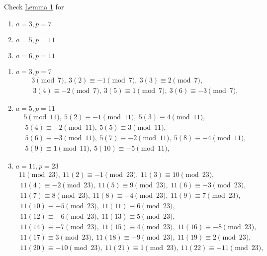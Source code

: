 \documentclass{ximera}
\begin{document}
\begin{br}
	Check \hyperref[lem:residues-gauss-lem]{Lemma 1} for 
	\begin{enumerate}
		\item $a=3, p=7$
		\item $a=5, p=11$
		\item $a=6, p=11$
	\end{enumerate}

	\begin{solution}
		\begin{enumerate}

		\item $a=3, p=7$ 
			\begin{align*}
				3\pmod{7},
				\ 3(2)\equiv -1\pmod{7},
				\ 3(3)\equiv 2\pmod{7},\\
				\ 3(4)\equiv -2\pmod{7},
				\ 3(5)\equiv 1\pmod{7},
				\ 3(6)\equiv -3\pmod{7},
			\end{align*}
		\item $a=5, p=11$
			\begin{align*}
				5\pmod{11},
				\ 5(2)\equiv -1\pmod{11},
				\ 5(3)\equiv 4\pmod{11},\\
				\ 5(4)\equiv -2\pmod{11},
				\ 5(5)\equiv 3\pmod{11},\\
				\ 5(6)\equiv -3\pmod{11},
				\ 5(7)\equiv -2\pmod{11},
				\ 5(8)\equiv -4\pmod{11},\\
				\ 5(9)\equiv 1\pmod{11},
				\ 5(10)\equiv -5\pmod{11},
			\end{align*}
		\item $a=11, p=23$
			\begin{align*}
				11\pmod{23},
				\ 11(2)\equiv -1\pmod{23},
				\ 11(3)\equiv 10\pmod{23},\\
				\ 11(4)\equiv -2\pmod{23},
				\ 11(5)\equiv 9\pmod{23},
				\ 11(6)\equiv -3\pmod{23},\\
				\ 11(7)\equiv 8\pmod{23},
				\ 11(8)\equiv -4\pmod{23},
				\ 11(9)\equiv 7\pmod{23},\\
				\ 11(10)\equiv -5\pmod{23},
				\ 11(11)\equiv 6\pmod{23},\\
				\ 11(12)\equiv -6\pmod{23},
				\ 11(13)\equiv 5\pmod{23},\\
				\ 11(14)\equiv -7\pmod{23},
				\ 11(15)\equiv 4\pmod{23},
				\ 11(16)\equiv -8\pmod{23},\\
				\ 11(17)\equiv 3\pmod{23},
				\ 11(18)\equiv -9\pmod{23},
				\ 11(19)\equiv 2\pmod{23},\\
				\ 11(20)\equiv -10\pmod{23},
				\ 11(21)\equiv 1\pmod{23},
				\ 11(22)\equiv -11\pmod{23},
			\end{align*}
		\end{enumerate}
	\end{solution}
\end{br}
\end{document}
